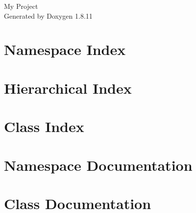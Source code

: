 \documentclass[twoside]{book}
\newcommand{\+}{\discretionary{\mbox{\scriptsize$\hookleftarrow$}}{}{}}
\newcommand{\clearemptydoublepage}{%
  \newpage{\pagestyle{empty}\cleardoublepage}%
}
\begin{document}
\hypersetup{pageanchor=false,
             bookmarksnumbered=true,
             pdfencoding=unicode
            }
\begin{titlepage}
\vspace*{7cm}
\begin{center}%
{\Large My Project }\\
\vspace*{1cm}
{\large Generated by Doxygen 1.8.11}\\
\end{center}
\end{titlepage}
\clearemptydoublepage
\tableofcontents
\clearemptydoublepage
{}
\hypersetup{pageanchor=true}

\chapter{Namespace Index}

\chapter{Hierarchical Index}

\chapter{Class Index}

\chapter{Namespace Documentation}




\chapter{Class Documentation}



































\backmatter
\newpage
{}
\clearemptydoublepage
{}
\printindex
\end{document}
